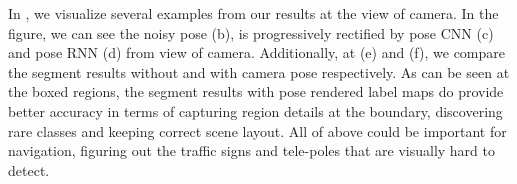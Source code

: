 
In , we visualize several examples from our results at the view of camera. In the figure, we can see the noisy pose (b), is progressively rectified by pose CNN (c) and pose RNN (d) from view of camera. Additionally, at (e) and (f), we compare the segment results without and with camera pose respectively. As can be seen at the boxed regions, the segment results with pose rendered label maps do provide better accuracy in terms of capturing region details at the boundary, discovering rare classes and keeping correct scene layout. All of above could be important for navigation, \eg figuring out the traffic signs and tele-poles that are visually hard to detect.

